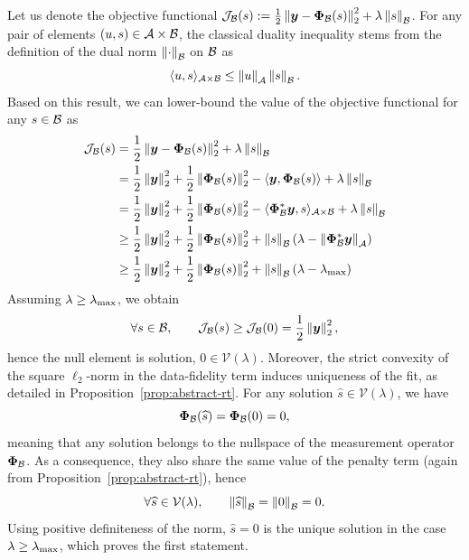     Let us denote the objective functional $\mathcal{J}_\mathcal{B}(s) := \frac{1}{2} \left\lVert\bm{y} - \bm{\Phi}_\mathcal{B}(s)\right\rVert_2^2 + \lambda \left\lVert s\right\rVert_{\mathcal{B}}$. For any pair of elements $(u, s) \in \mathcal{A} \times \mathcal{B}$, the classical duality inequality stems from the definition of the dual norm $\left\lVert\cdot\right\rVert_{\mathcal{B}}$ on $\mathcal{B}$ as
    \begin{equation*}
        \langle u, s \rangle_{\mathcal{A} \times \mathcal{B}} \leq \left\lVert u\right\rVert_{\mathcal{A}} \left\lVert s\right\rVert_{\mathcal{B}}.
    \end{equation*}
    Based on this result, we can lower-bound the value of the objective functional for any $s\in\mathcal{B}$ as
    \begin{align*}
        \mathcal{J}_\mathcal{B}(s) &= \frac{1}{2} \left\lVert\bm{y} - \bm{\Phi}_\mathcal{B}(s)\right\rVert_2^2 + \lambda \left\lVert s\right\rVert_{\mathcal{B}} \\
                &= \frac{1}{2} \left\lVert\bm{y}\right\rVert_2^2 + \frac{1}{2} \left\lVert\bm{\Phi}_\mathcal{B}(s)\right\rVert_2^2 - \langle \bm{y}, \bm{\Phi}_\mathcal{B}(s) \rangle + \lambda \left\lVert s\right\rVert_{\mathcal{B}} \\
                &= \frac{1}{2} \left\lVert\bm{y}\right\rVert_2^2 + \frac{1}{2} \left\lVert\bm{\Phi}_\mathcal{B}(s)\right\rVert_2^2 - \langle \bm{\Phi}_\mathcal{B}^*\bm{y}, s \rangle_{\mathcal{A} \times\mathcal{B}} + \lambda \left\lVert s\right\rVert_{\mathcal{B}} \\
                &\geq \frac{1}{2} \left\lVert\bm{y}\right\rVert_2^2 + \frac{1}{2} \left\lVert\bm{\Phi}_\mathcal{B}(s)\right\rVert_2^2 + \left\lVert s\right\rVert_{\mathcal{B}} \left(\lambda - \left\lVert\bm{\Phi}_\mathcal{B}^*\bm{y}\right\rVert_{\mathcal{A}} \right) \\
                &\geq \frac{1}{2} \left\lVert\bm{y}\right\rVert_2^2 + \frac{1}{2} \left\lVert\bm{\Phi}_\mathcal{B}(s)\right\rVert_2^2 + \left\lVert s\right\rVert_{\mathcal{B}} \left(\lambda - \lambda_\mathrm{max} \right)
    \end{align*}
    Assuming $\lambda \geq \lambda_\mathrm{max}$, we obtain
    \begin{equation*}
        \forall s \in \mathcal{B}, \qquad \mathcal{J}_\mathcal{B}(s) \geq \mathcal{J}_\mathcal{B}(0) = \frac{1}{2} \left\lVert\bm{y}\right\rVert_2^2,
    \end{equation*}
    hence the null element is solution, $0 \in \mathcal{V}(\lambda)$. Moreover, the strict convexity of the square $\ell_2$-norm in the data-fidelity term induces uniqueness of the fit, as detailed in Proposition~\ref{prop:abstract-rt}. For any solution $\widehat{s} \in \mathcal{V}(\lambda)$, we have 
    \begin{equation*}
        \bm{\Phi}_\mathcal{B}(\widehat{s}) = \bm{\Phi}_\mathcal{B}(0) = 0,
    \end{equation*}
    meaning that any solution belongs to the nullspace of the measurement operator $\bm{\Phi}_\mathcal{B}$.
    As a consequence, they also share the same value of the penalty term (again from Proposition~\ref{prop:abstract-rt}), hence
    \begin{equation*}
        \forall \widehat{s} \in \mathcal{V}(\lambda), \qquad \left\lVert\widehat{s}\right\rVert_{\mathcal{B}} = \left\lVert0\right\rVert_{\mathcal{B}} = 0.
    \end{equation*}
    Using positive definiteness of the norm, $\widehat{s}=0$ is the unique solution in the case $\lambda \geq \lambda_\mathrm{max}$, which proves the first statement.

